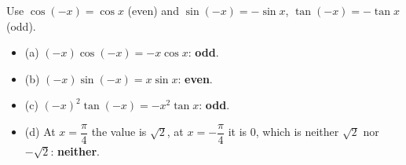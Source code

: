 Use $\cos(-x)=\cos x$ (even) and $\sin(-x)=-\sin x$, $\tan(-x)=-\tan x$ (odd).
\begin{itemize}
\item (a) $(-x)\cos(-x)=-x\cos x$: \textbf{odd}.
\item (b) $(-x)\sin(-x)=x\sin x$: \textbf{even}.
\item (c) $(-x)^2\tan(-x)=-x^2\tan x$: \textbf{odd}.
\item (d) At $x=\dfrac\pi4$ the value is $\sqrt2$, at $x=-\dfrac\pi4$ it is $0$, which is neither $\sqrt2$ nor $-\sqrt2$: \textbf{neither}.
\end{itemize}
